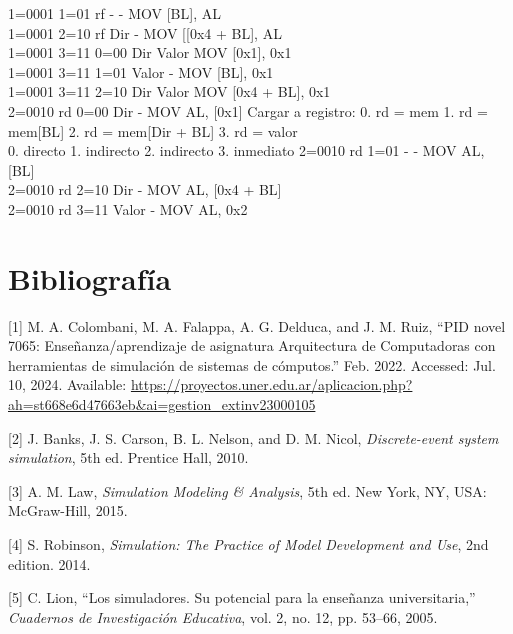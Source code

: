 \documentclass[12pt,twoside]{templates/unerthesis}
\begin{document}
1=0001 1=01 rf - - MOV {[}BL{]}, AL\\
1=0001 2=10 rf Dir - MOV {[}{[}0x4 + BL{]}, AL\\
1=0001 3=11 0=00 Dir Valor MOV {[}0x1{]}, 0x1\\
1=0001 3=11 1=01 Valor - MOV {[}BL{]}, 0x1\\
1=0001 3=11 2=10 Dir Valor MOV {[}0x4 + BL{]}, 0x1\\
2=0010 rd 0=00 Dir - MOV AL, {[}0x1{]} Cargar a registro:
0. rd = mem
1. rd = mem{[}BL{]}
2. rd = mem{[}Dir + BL{]}
3. rd = valor\\
0. directo
1. indirecto
2. indirecto
3. inmediato
2=0010 rd 1=01 - - MOV AL, {[}BL{]}\\
2=0010 rd 2=10 Dir - MOV AL, {[}0x4 + BL{]}\\
2=0010 rd 3=11 Valor - MOV AL, 0x2

\hypertarget{bibliografuxeda}{%
\chapter*{Bibliografía}\label{bibliografuxeda}}

\hypertarget{refs}{}
\leavevmode\hypertarget{ref-colombani_pid_2022}{}%
{[}1{]} M. A. Colombani, M. A. Falappa, A. G. Delduca, and J. M. Ruiz, ``PID novel 7065: Enseñanza/aprendizaje de asignatura Arquitectura de Computadoras con herramientas de simulación de sistemas de cómputos.'' Feb. 2022. Accessed: Jul. 10, 2024. Available: \href{https://proyectos.uner.edu.ar/aplicacion.php?ah=st668e6d47663eb\&ai=gestion_extinv\%7C\%7C23000105}{https://proyectos.uner.edu.ar/aplicacion.php?ah=st668e6d47663eb\&ai=gestion\_extinv\textbar{}\textbar{}23000105}

\leavevmode\hypertarget{ref-banks_discrete-event_2010}{}%
{[}2{]} J. Banks, J. S. Carson, B. L. Nelson, and D. M. Nicol, \emph{Discrete-event system simulation}, 5th ed. Prentice Hall, 2010.

\leavevmode\hypertarget{ref-law_simulation_2015}{}%
{[}3{]} A. M. Law, \emph{Simulation Modeling \& Analysis}, 5th ed. New York, NY, USA: McGraw-Hill, 2015.

\leavevmode\hypertarget{ref-robinson_simulation_2014}{}%
{[}4{]} S. Robinson, \emph{Simulation: The Practice of Model Development and Use}, 2nd edition. 2014.

\leavevmode\hypertarget{ref-lion_simuladores_2005}{}%
{[}5{]} C. Lion, ``Los simuladores. Su potencial para la enseñanza universitaria,'' \emph{Cuadernos de Investigación Educativa}, vol. 2, no. 12, pp. 53--66, 2005.
\end{document}
